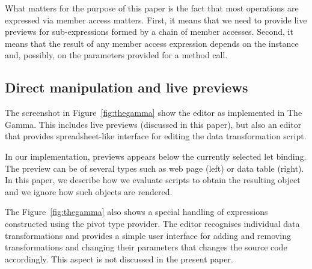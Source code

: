 \documentclass[sigplan,10pt]{acmart}\settopmatter{printfolios=true,printccs=false,printacmref=false}
\theoremstyle{plain}
\theoremstyle{definition}
\begin{document}
What matters for the purpose of this paper is 
the fact that most operations are expressed via member access matters. First, it means 
that we need to provide live previews for sub-expressions formed by a chain of member accesses.
Second, it means that the result of any member access expression depends on the instance and,
possibly, on the parameters provided for a method call.

\subsection{Direct manipulation and live previews}
The screenshot in Figure~\ref{fig:thegamma} show the editor as implemented in The Gamma. This
includes live previews (discussed in this paper), but also an editor that provides spreadsheet-like
interface for editing the data transformation script.

In our implementation, previews appears below the currently selected let binding.
The preview can be of several types such as web page (left) or data table (right). In this paper,
we describe how we evaluate scripts to obtain the resulting object and we ignore how such objects
are rendered.

The Figure~\ref{fig:thegamma} also shows a special handling of expressions constructed using the
pivot type provider. The editor recognises individual data transformations and provides a simple
user interface for adding and removing transformations and changing their parameters that changes
the source code accordingly. This aspect is not discussed in the present paper. 

\end{document}
